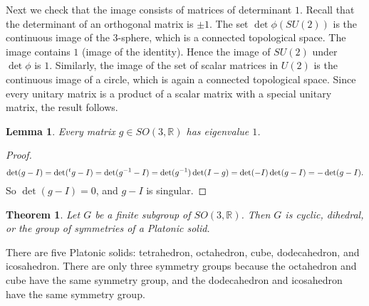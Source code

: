 \documentclass{amsart}
\newcommand{\ring}[1]{\mathbb{#1}}
\newtheorem{theorem}[equation]{Theorem}
\newtheorem{lemma}[equation]{Lemma}
\def\t#1{\hbox{}^t#1}
\begin{document}
Next we check that the image consists of matrices of determinant $1$.
Recall that the determinant of an orthogonal matrix is $\pm 1$.
The set $\det\phi(SU(2))$ is the continuous image of the $3$-sphere, which is a connected topological space.  The
image contains $1$ (image of the identity).  Hence the image of $SU(2)$ under $\det\phi$ is $1$.  Similarly,
the image of the set of scalar matrices in $U(2)$ is the continuous image of a circle, which is again a connected
topological space.  Since every unitary matrix is a product of a scalar matrix with a special unitary matrix,
the result follows.

\begin{lemma} Every matrix $g\in SO(3,\ring{R})$ has  eigenvalue $1$.
\end{lemma}

\begin{proof}
\[
\det (g-I) = \det(\t{g}-I) = \det(g^{-1}-I) = \det(g^{-1})\det(I - g) = 
\det(-I)\det(g - I) = -\det(g-I).
\]
So $\det(g-I)=0$, and $g-I$ is singular.
\end{proof}

\begin{theorem}
Let $G$ be a finite subgroup of $SO(3,\ring{R})$.  Then $G$ is cyclic, dihedral,
or the group of symmetries of a Platonic solid.
\end{theorem}

There are five Platonic solids: tetrahedron, octahedron, cube, dodecahedron, and icosahedron.
There are only three symmetry groups because the octahedron and cube have the same symmetry group,
and the dodecahedron and icosahedron have the same symmetry group.
\end{document}
